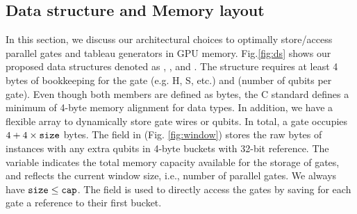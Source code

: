 \documentclass[runningheads]{llncs}
\begin{document}
%
%

\subsection{Data structure and Memory layout}

In this section, we discuss our architectural choices to optimally store/access parallel gates and tableau generators in GPU memory. Fig.\ref{fig:ds} shows our proposed data structures denoted as , , and . The  structure requires at least 4 bytes of bookkeeping for the gate  (e.g. H, S, etc.) and  (number of qubits per gate). Even though both members are defined as bytes, the C standard defines a minimum of 4-byte memory alignment for  data types. In addition, we have a flexible array  to dynamically store gate wires or qubits. In total, a gate occupies $4 + 4\times {{\texttt{size}}}$ bytes. The  field in  (Fig. \ref{fig:window}) stores the raw bytes of  instances with any extra qubits in 4-byte buckets with 32-bit reference. The  variable indicates the total memory capacity available for the storage of gates, and  reflects the current window size, i.e., number of parallel gates. We always have ${{\texttt{size}}} \leq {{\texttt{cap}}}$. The  field is used to directly access the gates by saving for each gate a reference to their first bucket. 
\end{document}
